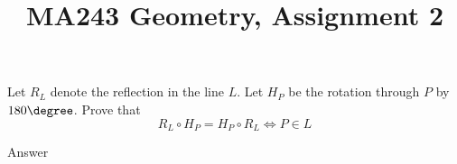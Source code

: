 \documentclass[a4paper]{article}
\title{MA243 Geometry, Assignment 2}
\begin{document}
\maketitle

\setlength{\parindent}{0em}
\setlength{\parskip}{1em}


\begin{questionbody}
%
Let $R_L$ denote the reflection in the line $L$. Let $H_P$ be the rotation through $P$ by $180\degree$. Prove that \[
R_L \circ H_P = H_P \circ R_L \iff P \in L
\]
\end{questionbody}

Answer


\end{document}
